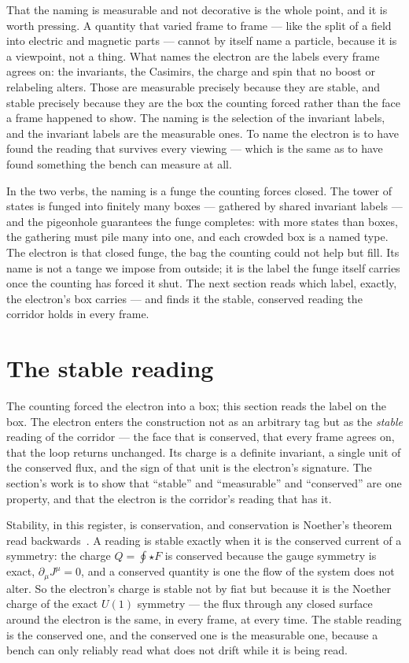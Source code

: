 That the naming is measurable and not decorative is the whole point, and it is worth pressing. A quantity that varied
frame to frame --- like the split of a field into electric and magnetic parts --- cannot by itself name a particle, because
it is a viewpoint, not a thing. What names the electron are the labels every frame agrees on: the invariants, the Casimirs,
the charge and spin that no boost or relabeling alters. Those are measurable precisely because they are stable, and stable
precisely because they are the box the counting forced rather than the face a frame happened to show. The naming is the
selection of the invariant labels, and the invariant labels are the measurable ones. To name the electron is to have found
the reading that survives every viewing --- which is the same as to have found something the bench can measure at all.

In the two verbs, the naming is a funge the counting forces closed. The tower of states is funged into finitely many
boxes --- gathered by shared invariant labels --- and the pigeonhole guarantees the funge completes: with more states than
boxes, the gathering must pile many into one, and each crowded box is a named type. The electron is that closed funge, the
bag the counting could not help but fill. Its name is not a tange we impose from outside; it is the label the funge itself
carries once the counting has forced it shut. The next section reads which label, exactly, the electron's box carries --- and
finds it the stable, conserved reading the corridor holds in every frame.

\section{The stable reading}

The counting forced the electron into a box; this section reads the label on the box. The electron enters the construction
not as an arbitrary tag but as the \emph{stable} reading of the corridor --- the face that is conserved, that every frame
agrees on, that the loop returns unchanged. Its charge is a definite invariant, a single unit of the conserved flux, and the
sign of that unit is the electron's signature. The section's work is to show that ``stable'' and ``measurable'' and
``conserved'' are one property, and that the electron is the corridor's reading that has it.

Stability, in this register, is conservation, and conservation is Noether's theorem read backwards~\cite{noether1918}. A
reading is stable exactly when it is the conserved current of a symmetry: the charge $Q = \oint \star F$ is conserved because
the gauge symmetry is exact, $\partial_\mu J^\mu = 0$, and a conserved quantity is one the flow of the system does not alter.
So the electron's charge is stable not by fiat but because it is the Noether charge of the exact $U(1)$ symmetry --- the flux
through any closed surface around the electron is the same, in every frame, at every time. The stable reading is the
conserved one, and the conserved one is the measurable one, because a bench can only reliably read what does not drift while
it is being read.

